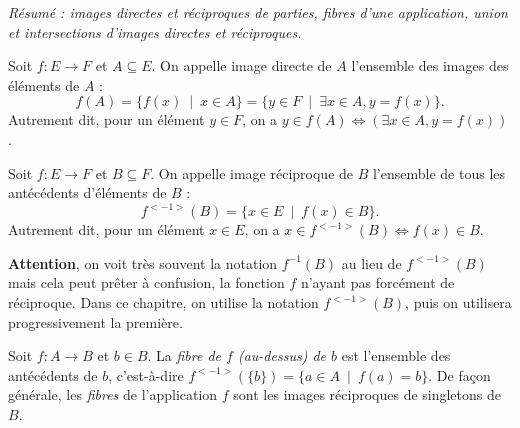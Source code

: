 \emph{Résumé : images directes et réciproques de parties, fibres d'une application, union et intersections d'images directes et réciproques.}


\begin{definition}
Soit $f : E\to F$ et $A\subseteq E$. On appelle image directe de $A$ l'ensemble des images des éléments de $A$ :
\[f(A) = \{f(x)\:\mid\: x\in A\} = \{y\in F \:\mid\: \exists x\in A, y=f(x)\}.\]
Autrement dit, pour un élément $y\in F$, on a $y\in f(A) \iff \left(\exists x\in A, y=f(x)\right)$.
\end{definition}
\begin{definition}
Soit $f : E\to F$ et $B\subseteq F$. On appelle image réciproque de $B$ l'ensemble de tous les antécédents d'éléments de $B$ :
\[f^{<-1>}(B) = \{x\in E\:\mid\: f(x)\in B \}.\]
Autrement dit, pour un élément $x\in E$, on a $x\in f^{<-1>}(B) \iff f(x)\in B$.

\textbf{Attention}, on voit très souvent la notation $f^{-1}(B)$ au lieu de $f^{<-1>}(B)$ mais cela peut prêter à confusion, la fonction $f$ n'ayant pas forcément de réciproque. Dans ce chapitre, on utilise la notation $f^{<-1>}(B)$, puis on utilisera progressivement la première.
\end{definition}

\begin{definition}
Soit $f : A\to B$ et $b\in B$. La \emph{fibre de $f$ (au-dessus) de $b$} est l'ensemble des antécédents de $b$, c'est-à-dire $f^{<-1>}(\{b\}) = \{a\in A \:\mid\: f(a)=b\}$. De façon générale, les \emph{fibres} de l'application $f$ sont les images réciproques de singletons de $B$.
\end{definition}

